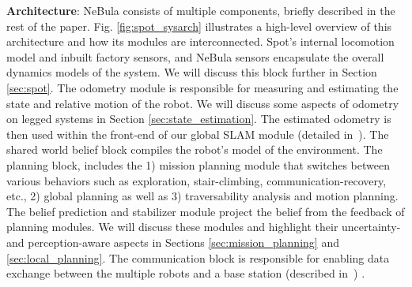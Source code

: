 \documentclass[letterpaper, 10pt, conference]{ieeeconf}      %
\newcommand{\ph}[1]{{\textbf{#1}:}} %
\newcommand{\rev}[1]{{\color{blue} #1 }} %
\begin{document}
\ph{Architecture} NeBula consists of multiple components, briefly described in the rest of the paper.
Fig. \ref{fig:spot_sysarch} illustrates a high-level overview of this architecture and how its modules are interconnected. 
Spot's internal locomotion model and inbuilt factory sensors, and NeBula sensors encapsulate the overall dynamics models of the system.
We will discuss this block further in Section \ref{sec:spot}.
The odometry module \rev{is responsible for measuring and estimating the state and relative motion of the robot.}
We will discuss some aspects of odometry on legged systems in Section \ref{sec:state_estimation}. 
The estimated odometry is then used within the front-end of our global SLAM \rev{module}(detailed in~\cite{Ebadi2020}). 
\rev{The shared world belief block compiles the robot's model of the environment.}
The planning block, includes the 1) mission planning module that switches between various behaviors \rev{such as}exploration, stair-climbing, communication-recovery, etc., 2) global planning \rev{as well as}3) \rev{traversability analysis and motion planning.} 
\rev{The belief prediction and stabilizer module project the belief from the feedback of planning modules.}
We will discuss these modules and highlight their uncertainty- and perception-aware aspects in Sections \ref{sec:mission_planning} and \ref{sec:local_planning}. 
The communication block is responsible for enabling data exchange between the multiple robots and a base station\rev{(described in~\cite{Otsu2020})}. 

\end{document}
